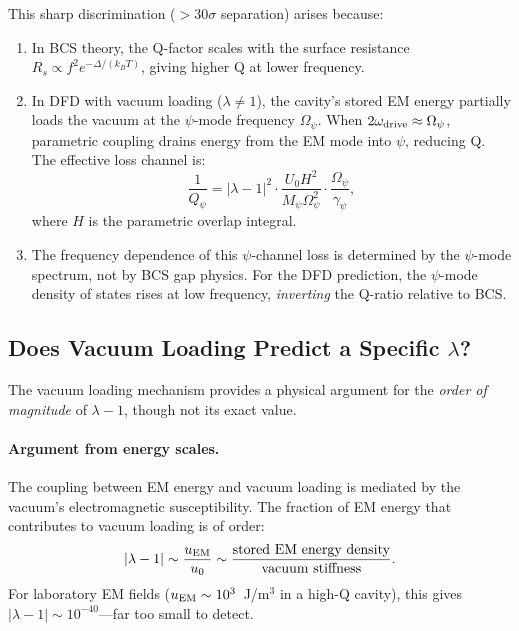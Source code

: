 \documentclass[11pt]{article}
\theoremstyle{plain}
\theoremstyle{definition}
\theoremstyle{remark}
\begin{document}
This sharp discrimination ($>30\sigma$ separation) arises because:
\begin{enumerate}
\item In BCS theory, the Q-factor scales with the surface resistance
$R_s \propto f^2 e^{-\Delta/(k_BT)}$, giving higher Q at lower frequency.

\item In DFD with vacuum loading ($\lambda \neq 1$), the cavity's stored
EM energy partially loads the vacuum at the $\psi$-mode frequency
$\Omega_\psi$. When $2\omega_{\rm drive} \approx \Omega_\psi$, parametric
coupling drains energy from the EM mode into $\psi$, reducing Q. The
effective loss channel is:
\begin{equation}
\frac{1}{Q_\psi} = |\lambda - 1|^2 \cdot \frac{U_0 H^2}{M_\psi \Omega_\psi^2}
\cdot \frac{\Omega_\psi}{\gamma_\psi},
\end{equation}
where $H$ is the parametric overlap integral.

\item The frequency dependence of this $\psi$-channel loss is determined
by the $\psi$-mode spectrum, not by BCS gap physics. For the DFD
prediction, the $\psi$-mode density of states rises at low frequency,
\emph{inverting} the Q-ratio relative to BCS.
\end{enumerate}

\subsection{Does Vacuum Loading Predict a Specific $\lambda$?}

The vacuum loading mechanism provides a physical argument for the
\emph{order of magnitude} of $\lambda - 1$, though not its exact value.

\paragraph{Argument from energy scales.}
The coupling between EM energy and vacuum loading is mediated by the
vacuum's electromagnetic susceptibility. The fraction of EM energy that
contributes to vacuum loading is of order:
\begin{equation}
|\lambda - 1| \sim \frac{u_{\rm EM}}{u_0} \sim \frac{\text{stored EM energy density}}{\text{vacuum stiffness}}.
\end{equation}
For laboratory EM fields ($u_{\rm EM} \sim 10^3$~J/m$^3$ in a high-Q cavity),
this gives $|\lambda - 1| \sim 10^{-40}$---far too small to detect.
\end{document}
